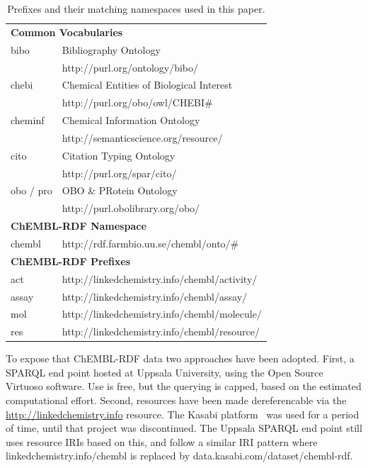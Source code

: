 \documentclass[10pt]{bmc_article}
\newenvironment{bmcformat}{\begin{raggedright}\baselineskip20pt\sloppy\setboolean{publ}{false}}{\end{raggedright}\baselineskip20pt\sloppy}
\begin{document}
\begin{bmcformat}
\begin{table}
\caption{Prefixes and their matching namespaces used in this paper.} \label{namespaces}
\begin{center}
\begin{tabular}{ll}
\hline
\multicolumn{2}{l}{\textbf{Common Vocabularies}} \\
bibo    & Bibliography Ontology~\cite{Giasson2011} \\
        & http://purl.org/ontology/bibo/ \\
chebi   & Chemical Entities of Biological Interest~\cite{DeMatos2010} \\
        & http://purl.org/obo/owl/CHEBI\# \\
cheminf & Chemical Information Ontology~\cite{Hastings2011} \\
        & http://semanticscience.org/resource/ \\
cito    & Citation Typing Ontology~\cite{Shotton2010} \\
        & http://purl.org/spar/cito/ \\
obo / pro & OBO \& PRotein Ontology~\cite{Sidhu2006} \\
          & http://purl.obolibrary.org/obo/ \\

\multicolumn{2}{l}{\textbf{ChEMBL-RDF Namespace}} \\
chembl & http://rdf.farmbio.uu.se/chembl/onto/\# \\

\multicolumn{2}{l}{\textbf{ChEMBL-RDF Prefixes }}\\
act    & http://linkedchemistry.info/chembl/activity/ \\
assay  & http://linkedchemistry.info/chembl/assay/ \\
mol    & http://linkedchemistry.info/chembl/molecule/ \\
res    & http://linkedchemistry.info/chembl/resource/ \\
\hline
\end{tabular}
\end{center}
\end{table}

To expose that ChEMBL-RDF data two approaches have been adopted. First, a SPARQL end point
hosted at Uppsala University, using the Open Source Virtuoso software. Use is free, but the
querying is capped, based on the estimated computational effort. Second, resources have
been made dereferencable via the \url{http://linkedchemistry.info} resource. The Kasabi
platform~\cite{kasabi} was used for a period of time, until that project was discontinued.
The Uppsala SPARQL end point still uses resource IRIs based on this, and follow a similar
IRI pattern where linkedchemistry.info/chembl is replaced by data.kasabi.com/dataset/chembl-rdf.


\end{bmcformat}
\end{document}
